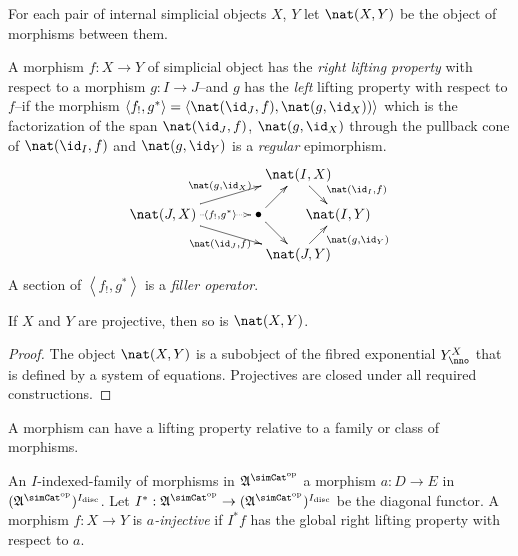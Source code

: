 \documentclass{tac}
\newcommand\hide[1]{}
\newcommand\ri{^*}
\newcommand\dual{^{\mathrm{op}}}
\newcommand\disc{_{\mathrm{disc}}}
\newcommand\s{^{\simCat\dual}}
\newcommand\bang{!}
\newcommand\of{:}
\newcommand\tuplet[1]{\left\langle #1 \right\rangle}
\newcommand\ambient{\mathfrak A}
\begin{document}
\begin{definition} For each pair of internal simplicial objects $X$, $Y$ let $\nat(X,Y)$ be the object of morphisms between them.

A morphism $f\of X\to Y$ of simplicial object has the \emph{right lifting property} with respect to a morphism $g\of I\to J$--and $g$ has the \emph{left} lifting property with respect to $f$--if the morphism $\tuplet{f_!,g\ri} = \tuplet{\nat(\id_J,f),\nat(g,\id_X))}$ 
which is the factorization of the span $\nat(\id_J,f)$, $\nat(g,\id_X)$ through the pullback cone of $\nat(\id_I,f)$ and $\nat(g,\id_Y)$
is a \emph{regular} epimorphism.
\[\xy
(34,20)*+{\nat(I,X)}="top",(0,10)*+{\nat(J,X)}="left",(24,10)*+{\bullet}="middle",(44,10)*+{\nat(I,Y)}="right",(34,0)*+{\nat(J,Y)}="bottom"
\ar^{\nat(g,\id_X)} "left";"top" \ar@{.>}|(.6){\tuplet{f_!,g\ri}} "left";"middle" \ar_{\nat(\id_J,f)} "left";"bottom" \ar "middle";"bottom"
\ar "middle";"top" \ar^(.6){\nat(\id_I,f)} "top";"right" \ar_(.6){\nat(g,\id_Y)} "bottom";"right"
\endxy\]
A section of $\tuplet{f_\bang,g\ri}$ is a \emph{filler operator}.\label{lifting}
\end{definition}

\hide{explain why this is important}
\begin{lemma} If $X$ and $Y$ are projective, then so is $\nat(X,Y)$. \end{lemma}

\begin{proof} The object $\nat(X,Y)$ is a subobject of the fibred exponential $Y^X_\nno$ that is defined by a system of equations. Projectives are closed under all required constructions.
\end{proof}

A morphism can have a lifting property relative to a family or class of morphisms.


\hide{
New idea: everything follows form the projectivity of added faces.

We don't need the object of realizers anymore either.
}

\hide{
Explain $I\ri\of\ambient\s\to (\ambient\s)^{I\disc}$ somewhere. It should be an internal simplicial object of the slice category. i.e. $(\ambient/I)\s$. 
}
\begin{definition}[Injective] An $I$-indexed-family of morphisms in $\ambient\s$ a morphism $a\of D\to E$ in $(\ambient\s)^{I\disc}$. Let $I\ri\of\ambient\s\to (\ambient\s)^{I\disc}$ be the diagonal functor. A morphism $f\of X\to Y$ is \emph{$a$-injective} if $I\ri f$ has the global right lifting property with respect to $a$.
\end{definition}
\end{document}
